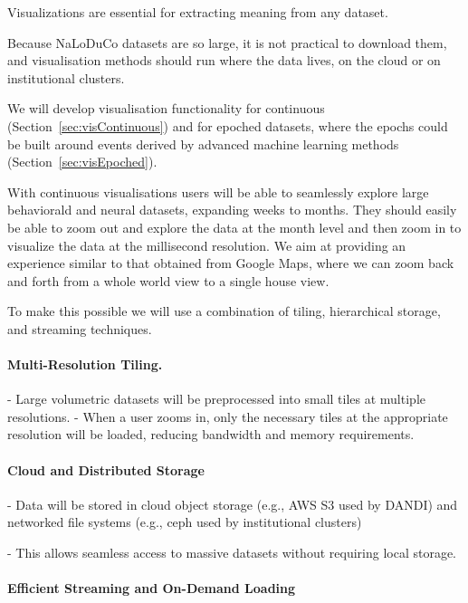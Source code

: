 
Visualizations are essential  for extracting meaning from any dataset.

Because NaLoDuCo datasets are so large, it is not practical to download them,
and visualisation methods should run where the data lives, on the cloud or on
institutional clusters.

We will develop visualisation functionality for continuous
(Section~\ref{sec:visContinuous}) and for epoched
datasets, where the epochs could be built around events derived by advanced
machine learning methods 
(Section~\ref{sec:visEpoched}).

\label{sec:continousVis}

With continuous visualisations users will be able to seamlessly explore large
behaviorald and neural datasets, expanding weeks to months. They should easily be able to zoom out and
explore the data at the month level and then zoom in to visualize the data at
the millisecond resolution. We aim at providing an experience similar to that
obtained from Google Maps, where we can zoom back and forth from a whole world
view to a single house view.

To make this possible we will use a combination of tiling, hierarchical
storage, and streaming techniques.

\paragraph{Multi-Resolution Tiling.}

- Large volumetric datasets will be preprocessed into small tiles at multiple resolutions.
- When a user zooms in, only the necessary tiles at the appropriate resolution
will be loaded, reducing bandwidth and memory requirements.

\paragraph{Cloud and Distributed Storage}

- Data will be stored in cloud object storage (e.g., AWS S3 used by DANDI) and
networked file systems (e.g., ceph used by institutional clusters)

- This allows seamless access to massive datasets without requiring local storage.

\paragraph{Efficient Streaming and On-Demand Loading}

